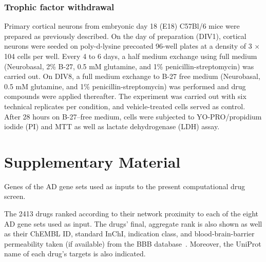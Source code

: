 \documentclass[letterpaper]{article}
\begin{document}
\subsubsection{Trophic factor withdrawal}

Primary cortical neurons from embryonic day 18 (E18) C57Bl/6 mice were
prepared as previously described. On the day of preparation (DIV1), cortical
neurons were seeded on poly-d-lysine precoated 96-well plates at a density of
3 $\times$ 104 cells per well. Every 4 to 6 days, a half medium exchange using full
medium (Neurobasal, 2\% B-27, 0.5 mM glutamine, and 1\% penicillin-streptomycin)
was carried out. On DIV8, a full medium exchange to B-27 free medium
(Neurobasal, 0.5 mM glutamine, and 1\% penicillin-streptomycin) was performed
and drug compounds were applied thereafter. The experiment was carried out
with six technical replicates per condition, and vehicle-treated cells
served as control. After 28 hours on B-27–free medium, cells were subjected to
YO-PRO/propidium iodide (PI) and MTT as well as lactate dehydrogenase (LDH)
assay.




\newpage

\section*{Supplementary Material}

\setcounter{table}{0}
\makeatletter 
\renewcommand{\tablename}{Table S} %
\makeatother

\setcounter{figure}{0}
\makeatletter 
\renewcommand{\figurename}{Figure S} %
\makeatother

\begin{table}[p]
\caption{
  Genes of the AD gene sets used as inputs to the present computational drug screen.
}
\label{tab:genes-in-genesets}
\end{table}

\begin{table}[p]
\caption{
  The 2413 drugs ranked according to their network proximity to each of the eight
  AD gene sets used as input.  The drugs' final, aggregate rank is also shown
  as well as their ChEMBL ID, standard InChI, indication class, and
  blood-brain-barrier permeability taken (if available) from the BBB
  database~\citep{Meng2021}.  Moreover, the UniProt name of each drug's
  targets is also indicated.
}
\label{tab:ranked-drugs}
\end{table}
\end{document}
